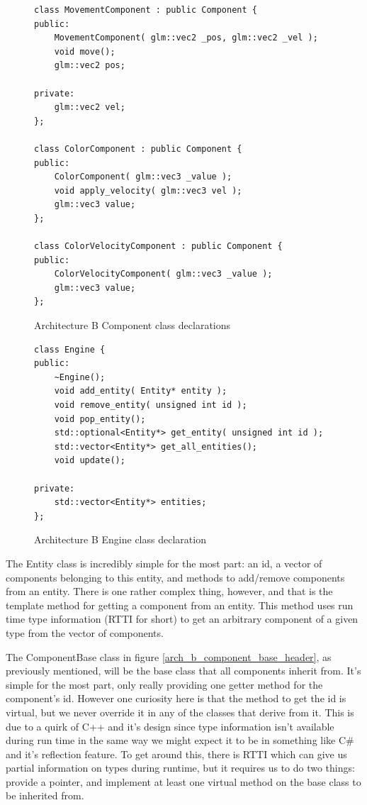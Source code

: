 \documentclass{article}
\begin{document}
\begin{figure}
\centering
\begin{BVerbatim}
class MovementComponent : public Component {
public:
    MovementComponent( glm::vec2 _pos, glm::vec2 _vel );
    void move();
    glm::vec2 pos;

private:
    glm::vec2 vel;
};

class ColorComponent : public Component {
public:
    ColorComponent( glm::vec3 _value );
    void apply_velocity( glm::vec3 vel );
    glm::vec3 value;
};

class ColorVelocityComponent : public Component {
public:
    ColorVelocityComponent( glm::vec3 _value );
    glm::vec3 value;
};
\end{BVerbatim}
\caption{Architecture B Component class declarations}
\label{arch_b_components_header}
\end{figure}

\begin{figure}
\centering
\begin{BVerbatim}
class Engine {
public:
    ~Engine();
    void add_entity( Entity* entity );
    void remove_entity( unsigned int id );
    void pop_entity();
    std::optional<Entity*> get_entity( unsigned int id );
    std::vector<Entity*> get_all_entities();
    void update();

private:
    std::vector<Entity*> entities;
};
\end{BVerbatim}
\caption{Architecture B Engine class declaration}
\label{arch_b_engine_header}
\end{figure}

The Entity class is incredibly simple for the most part: an id, a vector of
components belonging to this entity, and methods to add/remove components from
an entity. There is one rather complex thing, however, and that is the template
method for getting a component from an entity. This method uses run time type
information (RTTI for short) to get an arbitrary component of a given type from
the vector of components.

The ComponentBase class in figure \ref{arch_b_component_base_header}, as
previously mentioned, will be the base class that all components inherit from.
It's simple for the most part, only really providing one getter method for the
component's id. However one curiosity here is that the method to get the id is
virtual, but we never override it in any of the classes that derive from it.
This is due to a quirk of C++ and it's design since type information isn't
available during run time in the same way we might expect it to be in something
like C\# and it's reflection feature. To get around this, there is RTTI which
can give us partial information on types during runtime, but it requires us to
do two things: provide a pointer, and implement at least one virtual method on
the base class to be inherited from.
\end{document}
